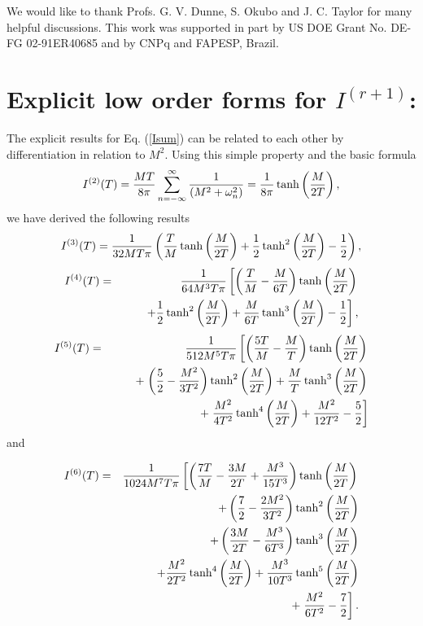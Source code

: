 \documentclass[a4paper,12pt]{article}
\begin{document}
We would like to thank Profs. G. V. Dunne, S. Okubo and J. C. Taylor
for many helpful discussions. This work was supported in part by US DOE Grant
No. DE-FG 02-91ER40685 and by CNPq and FAPESP, Brazil.

\appendix
\section{Explicit low order forms for $I^{(r+1)}$:}
The explicit results for Eq. (\ref{Isum}) can be related to each other 
by differentiation in relation to $M^2$. Using this simple property and
the basic formula
\begin{equation}
I^{(2)}(T) = {MT\over 
8\pi}\sum_{n=-\infty}^{\infty}{1\over\left(M^2+\omega_n^2\right)}=
{1\over 8\pi} \tanh\left({M\over 2T}\right),
\end{equation}
we have derived the following results
\begin{equation}
I^{(3)}(T) = {1\over 32 M T \pi}\left({T\over M}
\tanh\left({M\over 2T}\right)
+{1\over 2}\tanh^2\left({M\over 2 T}\right)-{1\over 2}\right),
\end{equation}
\begin{eqnarray}
I^{(4)}(T) & = &   {1\over 64 M^3 T \pi}\left[
\left({T\over M}-{M\over 6 T}\right)
\tanh\left({M\over 2 T}\right)\right.\nonumber\\
& & \qquad 
\left. + {1\over 2}\tanh^2\left({M\over 2 T}\right)
+{M\over 6 T}\tanh^3\left({M\over 2 T}\right)
-{1\over 2}\right],
\end{eqnarray}
\begin{eqnarray}
I^{(5)}(T) & = & {1\over 512 M^5 T \pi}\left[
\left({5 T\over M}-{M\over T}\right)
\tanh\left({M\over 2 T}\right) \right.\nonumber\\
& & \qquad + \left. \left({5\over 2}-{M^2\over 3 T^2}\right)
\tanh^2\left({M\over 2 T}\right)
+ {M\over T} \tanh^3\left({M\over 2 T}\right) \right.\nonumber\\
& & \qquad + \left. {M^2\over 4 T^2}
\tanh^4\left({M\over 2 T}\right)+
{M^2\over 12 T^2} -{5\over 2} \right]
\end{eqnarray}
and

\begin{eqnarray}
I^{(6)}(T) & = & {1\over 1024 M^7 T \pi}\left[
\left({7 T\over M}-{3M\over 2 T} + {M^3\over 15 T^3}\right)
\tanh\left({M\over 2 T}\right)
\right.\nonumber\\ 
& & \qquad +
\left({7\over 2}-{2 M^2\over 3 T^2}\right)
\tanh^2\left({M\over 2 T}\right) \nonumber\\
& & \qquad +
\left({3M\over 2 T}-{M^3\over 6 T^3}\right)
\tanh^3\left({M\over 2 T}\right) \nonumber\\
& & \qquad +
{M^2\over 2 T^2}\tanh^4\left({M\over 2 T}\right)
+{M^3\over 10 T^3}\tanh^5\left({M\over 2 T}\right)
 \nonumber\\ 
& & \qquad\qquad + 
\left.{M^2\over 6 T^2} -{7\over 2} \right].
\end{eqnarray}
\end{document}
